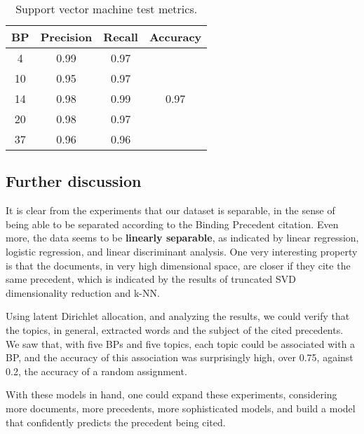         \begin{table}[H]
                \centering
                \caption{Support vector machine test metrics.}
                \label{tab:svm}
                \begin{tabular}{c|cc|c}
                BP & Precision & Recall & Accuracy              \\ \hline
                4  & 0.99      & 0.97   & \multirow{5}{*}{0.97} \\
                10 & 0.95      & 0.97   &                       \\
                14 & 0.98      & 0.99   &                       \\
                20 & 0.98      & 0.97   &                       \\
                37 & 0.96      & 0.96   &                      
                \end{tabular}
        \end{table}

    \subsection{Further discussion}

        It is clear from the experiments that our dataset is separable, in the sense of being able to be separated according to the Binding Precedent citation. Even more, the data seems to be \textbf{linearly separable}, as indicated by linear regression, logistic regression, and linear discriminant analysis. One very interesting property is that the documents, in very high dimensional space, are closer if they cite the same precedent, which is indicated by the results of truncated SVD dimensionality reduction and k-NN.

        Using latent Dirichlet allocation, and analyzing the results, we could verify that the topics, in general, extracted words and the subject of the cited precedents. We saw that, with five BPs and five topics, each topic could be associated with a BP, and the accuracy of this association was surprisingly high, over 0.75, against 0.2, the accuracy of a random assignment.

        With these models in hand, one could expand these experiments, considering more documents, more precedents, more sophisticated models, and build a model that confidently predicts the precedent being cited.

